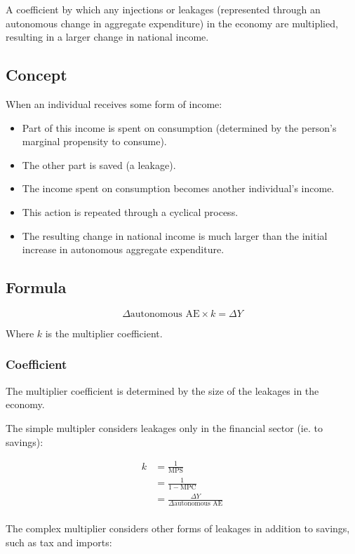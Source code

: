 \documentclass[a4paper,11pt]{article}
\begin{document}
A coefficient by which any injections or leakages (represented through an
autonomous change in aggregate expenditure) in the economy are multiplied,
resulting in a larger change in national income.


\subsection{Concept}

When an individual receives some form of income:

\begin{itemize}
\item Part of this income is spent on consumption (determined by the person's
	marginal propensity to consume).
\item The other part is saved (a leakage).
\item The income spent on consumption becomes another individual's income.
\item This action is repeated through a cyclical process.
\item The resulting change in national income is much larger than the initial
	increase in autonomous aggregate expenditure.
\end{itemize}


\subsection{Formula}

$$
\Delta \mbox{autonomous AE} \times k = \Delta Y
$$

Where $k$ is the multiplier coefficient.


\subsubsection{Coefficient}

The multiplier coefficient is determined by the size of the leakages in the
economy.

The simple multipler considers leakages only in the financial sector (ie. to
savings):

$$
\begin{aligned}
k & = \frac{1}{\mbox{MPS}} \\
& = \frac{1}{1 - \mbox{MPC}} \\
& = \frac{\Delta Y}{\Delta \mbox{autonomous AE}} \\
\end{aligned}
$$

The complex multiplier considers other forms of leakages in addition to savings,
such as tax and imports:
\end{document}
